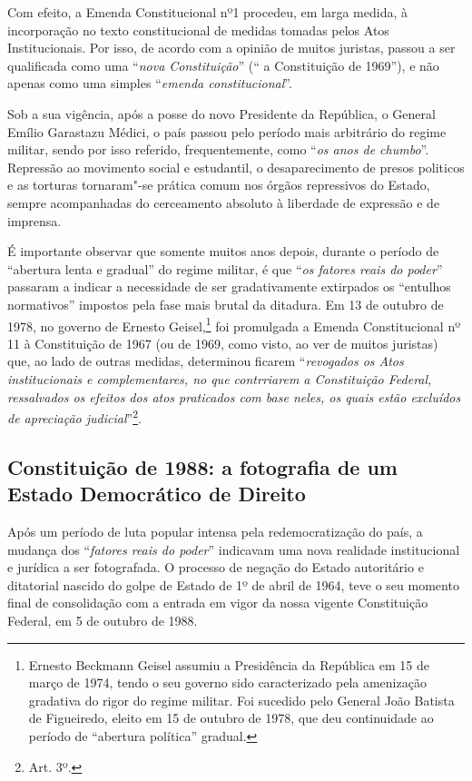 Com efeito, a Emenda Constitucional nº1 procedeu, em larga medida, à
incorporação no texto constitucional de medidas tomadas pelos Atos
Institucionais. Por isso, de acordo com a opinião de muitos juristas,
passou a ser qualificada como uma ``\emph{nova Constituição}'' (`` a
Constituição de 1969''), e não apenas como uma simples ``\emph{emenda
constitucional}''.

Sob a sua vigência, após a posse do novo Presidente da República, o
General Emílio Garastazu Médici, o país passou pelo período mais
arbitrário do regime militar, sendo por isso referido, frequentemente,
como ``\emph{os anos de chumbo}''. Repressão ao movimento social e
estudantil, o desaparecimento de presos politicos e as torturas
tornaram"-se prática comum nos órgãos repressivos do Estado, sempre
acompanhadas do cerceamento absoluto à liberdade de expressão e de
imprensa.

É importante observar que somente muitos anos depois, durante o período
de ``abertura lenta e gradual'' do regime militar, é que ``\emph{os
fatores reais do poder}'' passaram a indicar a necessidade de ser
gradativamente extirpados os ``entulhos normativos'' impostos pela fase
mais brutal da ditadura. Em 13 de outubro de 1978, no governo de Ernesto
Geisel,\footnote{Ernesto Beckmann Geisel assumiu a Presidência da
  República em 15 de março de 1974, tendo o seu governo sido
  caracterizado pela amenização gradativa do rigor do regime militar.
  Foi sucedido pelo General João Batista de Figueiredo, eleito em 15 de
  outubro de 1978, que deu continuidade ao período de ``abertura
  política'' gradual.} foi promulgada a Emenda Constitucional nº 11 à
Constituição de 1967 (ou de 1969, como visto, ao ver de muitos juristas)
que, ao lado de outras medidas, determinou ficarem ``\emph{revogados os
Atos institucionais e complementares, no que contrriarem a Constituição
Federal, ressalvados os efeitos dos atos praticados com base neles, os
quais estão excluídos de apreciação judicial}''\footnote{Art. 3º.}.

\subsection{Constituição de 1988: a fotografia de um Estado
Democrático de Direito}

Após um período de luta popular intensa pela redemocratização do país, a
mudança dos ``\emph{fatores reais do poder}'' indicavam uma nova
realidade institucional e jurídica a ser fotografada. O processo de
negação do Estado autoritário e ditatorial nascido do golpe de Estado de
1º de abril de 1964, teve o seu momento final de consolidação com a
entrada em vigor da nossa vigente Constituição Federal, em 5 de outubro
de 1988.

